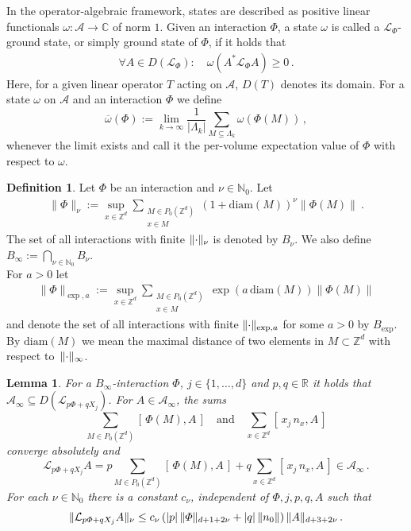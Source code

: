 \documentclass[a4paper]{article}
\renewcommand{\Phi}{\varPhi}
\newcommand{\La}{\Lambda}
\newcommand{\w}{\omega}
\newcommand{\N}{\mathbb{N}}
\newcommand{\Z}{\mathbb{Z}}
\newcommand{\C}{\mathbb{C}}
\newcommand{\mA}{\mathcal{A}}
\newcommand{\R}{\mathbb{R}}
\newcommand{\mL}{\mathcal{L}}
\DeclarePairedDelimiter\norm{\lVert}{\rVert}
\theoremstyle{plain}
\newtheorem{lemma}[theorem]{Lemma}
\theoremstyle{definition}
\newtheorem{definition}[theorem]{Definition}
\theoremstyle{remark}
\renewcommand{\(}{\left(}
\renewcommand{\)}{\right)}
\begin{document}
In the operator-algebraic framework, states are described as positive linear functionals $\w \colon \mA \to \C$ of norm $1$. Given an interaction $\Phi$, a state $\w$ is called a $\mL_{\Phi}$-ground state, or simply ground state of $\Phi$, if it holds that 
\begin{align*}
 \forall A \in D(\mL_\Phi) : \quad  \w(A^* \mL_\Phi A) \geq 0   \, .
\end{align*}
Here, for a given linear operator $ T $ acting on $\mathcal{A}$, $ D(T) $ denotes its domain.
For a state $\w$ on $\mA$ and an interaction $\Phi$ we define 
   \begin{equation} \label{eq:omegaPUV}
   \overline{\w}(\Phi) := \lim_{k\to \infty} \frac{1}{|\La_k|}\sum_{M\subseteq \La_k} \w(\Phi(M))\, ,
   \end{equation}
   whenever the limit exists  and call it the per-volume expectation value of $\Phi$ with respect to $\w$.


\medskip


\begin{definition}\label{norm interaction}
    Let $\Phi$ be an interaction and $\nu \in \N_{0}$. Let
    \begin{align*}
        \|\Phi\|_{\nu} := \sup_{x\in \Z^d} \sum_{\substack{M\in
        P_0(\Z^d)\\x\in M}}(1+\mathrm{diam}(M))^\nu  \| \Phi(M)\|  ~.
    \end{align*}
    The set of all interactions with finite $\norm{\cdot}_{\nu}$ is denoted by $B_{\nu}$. We also define $B_{\infty} := \bigcap_{\nu \in \N_0} B_{\nu}$. \\
    For $a>0$ let
    \begin{align*}
        \|\Phi\|_{\exp,a} := \sup_{x\in \Z^d} \sum_{\substack{M\in 
        P_0(\Z^d)\\x\in M}} \exp(a \, \mathrm{diam}(M))  \| \Phi(M)\| 
    \end{align*}
    and denote the set of all interactions with finite $\norm{\cdot}_{\exp,a}$ for some $a>0$ by $B_{\exp}$. By $\mathrm{diam}(M)$ we mean the maximal distance of two elements in $M\subset\Z^d$ with respect to~$\norm{\cdot}_\infty$.
\end{definition}

\medskip

\begin{lemma}\label{lem: sum representation of generator}
    For a $B_\infty$-interaction $\Phi$, $j\in \{ 1,\dots, d \}$ and $p,q\in \R$ it holds that $\mA_\infty \subseteq D(\mL_{p \Phi + q X_j})$. For $ A\in \mA_\infty$, the sums 
    \[\sum_{M\in P_0(\Z^d)} [\,\Phi(M),A\,] \quad \text{and} \quad \sum_{x\in \Z^d} [\,x_j\,n_x,A\,]\] converge absolutely and  
    \[ \mL_{p \Phi + q X_j}A = p \sum_{M\in P_0(\Z^d)} [\,\Phi(M),A\,] + q \sum_{x\in \Z^d} [\,x_j\,n_x,A\,] \in \mA_\infty \,. \]
    For each $\nu \in \N_0$ there is a constant $c_\nu$, independent of $\Phi, j, p, q, A$ such that
    \[ \norm{ \mL_{p \Phi + q X_j}A }_\nu \leq c_\nu \, (|p| \,\norm{\Phi}_{d+1+2\nu} + |q| \,\norm{n_0}) \, \norm{A}_{d+3+2\nu}\,.\]
\end{lemma}
\end{document}
